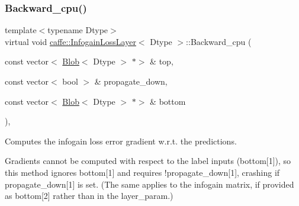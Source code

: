 \subsubsection{\texorpdfstring{Backward\+\_\+cpu()}{Backward\_cpu()}\hspace{0.1cm}{\footnotesize\ttfamily [2/2]}}
{\footnotesize\ttfamily template$<$typename Dtype$>$ \\
virtual void \mbox{\hyperlink{classcaffe_1_1_infogain_loss_layer}{caffe\+::\+Infogain\+Loss\+Layer}}$<$ Dtype $>$\+::Backward\+\_\+cpu (\begin{DoxyParamCaption}\item[{const vector$<$ \mbox{\hyperlink{classcaffe_1_1_blob}{Blob}}$<$ Dtype $>$ $\ast$$>$ \&}]{top,  }\item[{const vector$<$ bool $>$ \&}]{propagate\+\_\+down,  }\item[{const vector$<$ \mbox{\hyperlink{classcaffe_1_1_blob}{Blob}}$<$ Dtype $>$ $\ast$$>$ \&}]{bottom }\end{DoxyParamCaption})\hspace{0.3cm}{\ttfamily [protected]}, {\ttfamily [virtual]}}



Computes the infogain loss error gradient w.\+r.\+t. the predictions. 

Gradients cannot be computed with respect to the label inputs (bottom\mbox{[}1\mbox{]}), so this method ignores bottom\mbox{[}1\mbox{]} and requires !propagate\+\_\+down\mbox{[}1\mbox{]}, crashing if propagate\+\_\+down\mbox{[}1\mbox{]} is set. (The same applies to the infogain matrix, if provided as bottom\mbox{[}2\mbox{]} rather than in the layer\+\_\+param.)


